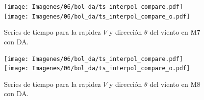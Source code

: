\begin{figure}[H]
	\centering
	\texttt{[image: Imagenes/06/bol\_da/ts\_interpol\_compare.pdf]}\\%
	\texttt{[image: Imagenes/06/bol\_da/ts\_interpol\_compare\_o.pdf]}%
	\vspace{-2mm}\caption{Series de tiempo para la rapidez $V$ y dirección $\theta$ del viento en M7 con DA.}
	\label{fig:06_bol_da_ts_m7}
\end{figure}

\begin{figure}[H]
	\centering
	\texttt{[image: Imagenes/06/bol\_da/ts\_interpol\_compare.pdf]}\\%
	\texttt{[image: Imagenes/06/bol\_da/ts\_interpol\_compare\_o.pdf]}%
	\vspace{-2mm}\caption{Series de tiempo para la rapidez $V$ y dirección $\theta$ del viento en M8 con DA.}
	\label{fig:06_bol_da_ts_m8}
\end{figure}

